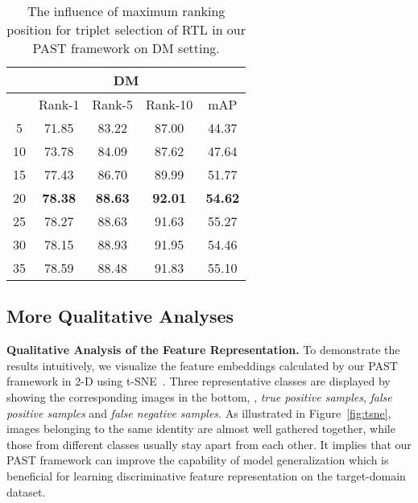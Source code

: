 \documentclass[10pt,twocolumn,letterpaper]{article}
\begin{document}
\begin{table}[b]
\setlength{\belowcaptionskip}{-0.1cm}
\setlength{\abovecaptionskip}{-0.2cm} 
\begin{center}
\begin{tabular}{ccccc}
\hline
\multicolumn{5}{c}{DM}                                         \\ \hline \hline
\multicolumn{1}{c|}{} & \multicolumn{1}{c|}{Rank-1} & \multicolumn{1}{c|}{Rank-5} & \multicolumn{1}{c|}{Rank-10} & \multicolumn{1}{c}{mAP}   \\ \hline
\multicolumn{1}{c|}{5}  & \multicolumn{1}{c|}{71.85}  & \multicolumn{1}{c|}{83.22}  & \multicolumn{1}{c|}{87.00}   & 44.37 \\
\multicolumn{1}{c|}{10} & \multicolumn{1}{c|}{73.78}  & \multicolumn{1}{c|}{84.09}  & \multicolumn{1}{c|}{87.62}   & 47.64 \\
\multicolumn{1}{c|}{15} & \multicolumn{1}{c|}{77.43} & \multicolumn{1}{c|}{86.70}  & \multicolumn{1}{c|}{89.99}   & 51.77 \\
\multicolumn{1}{c|}{20} & \multicolumn{1}{c|}{\textbf{78.38}}  & \multicolumn{1}{c|}{\textbf{88.63}}  & \multicolumn{1}{c|}{\textbf{92.01}}   & \textbf{54.62}  \\
\multicolumn{1}{c|}{25} & \multicolumn{1}{c|}{78.27} & \multicolumn{1}{c|}{88.63}  & \multicolumn{1}{c|}{91.63}   & 55.27 \\
\multicolumn{1}{c|}{30} & \multicolumn{1}{c|}{78.15}  & \multicolumn{1}{c|}{88.93}  & \multicolumn{1}{c|}{91.95}   & 54.46 \\
\multicolumn{1}{c|}{35} & \multicolumn{1}{c|}{78.59}  & \multicolumn{1}{c|}{88.48}  & \multicolumn{1}{c|}{91.83}   & 55.10 \\ \hline
\end{tabular}
\end{center}
\caption{The influence of maximum ranking position  for triplet selection of RTL in our PAST framework on DM setting.}
\label{fig:position}
\end{table}


\subsection{More Qualitative Analyses}
\textbf{Qualitative Analysis of the Feature Representation.}
To demonstrate the results intuitively, we visualize the feature embeddings calculated by our PAST framework in 2-D using t-SNE~\cite{tsne}. Three representative classes are displayed by showing the corresponding images in the bottom, \ie, \textit{true positive samples}, \textit{false positive samples} and \textit{false negative samples}. As illustrated in Figure~\ref{fig:tsne}, images belonging to the same identity are almost well gathered together, while those from different classes usually stay apart from each other. It implies that our PAST framework can improve the capability of model generalization which is beneficial for learning discriminative feature representation on the target-domain dataset.
\end{document}
